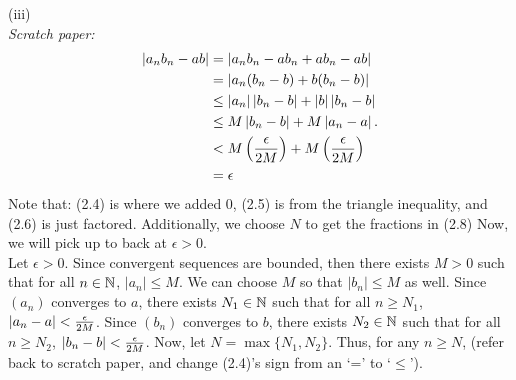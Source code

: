 {(iii) \\
\textit{Scratch paper:}
\begin{align}
    \left|a_nb_n - ab\right| & = \left|a_nb_n - ab_n + ab_n - ab\right|                                    \\
                         & = \left|a_n(b_n - b) + b(b_n - b)\right|                                    \\
                         & \leq \left|a_n\right|\left|b_n - b\right| + \left|b\right|\left|b_n - b\right|          \\
                         & \leq M\left|b_n - b\right| + M\left|a_n - a\right|.                             \\
                         & < M\left(\frac{\epsilon}{2M}\right) + M\left(\frac{\epsilon}{2M}\right) \\
                         & = \epsilon
\end{align}
Note that: (2.4) is where we added 0, (2.5) is from the triangle inequality, and (2.6) is just factored. Additionally, we choose \(N\) to get the fractions in (2.8) Now, we will pick up to back at $\epsilon > 0$. \\

Let \(\epsilon > 0\). Since convergent sequences are bounded, then there exists $M > 0$ such that for all $n \in \mathbb{N}$, $|a_n| \leq M$. We can choose \(M\) so that \(|b_n| \leq M\) as well. Since $(a_n)$ converges to $a$, there exists $N_1 \in \mathbb{N}$ such that for all $n \geq N_1$, $\left|a_n - a\right| < \frac{\epsilon}{2M}$. Since $(b_n)$ converges to $b$, there exists $N_2 \in \mathbb{N}$ such that for all $n \geq N_2$, $\left|b_n - b\right| < \frac{\epsilon}{2M}$. Now, let $N = \max\{N_1, N_2\}$. Thus, for any $n \geq N$, (refer back to scratch paper, and change (2.4)'s sign from an `=' to `$\leq$'). \\

}
